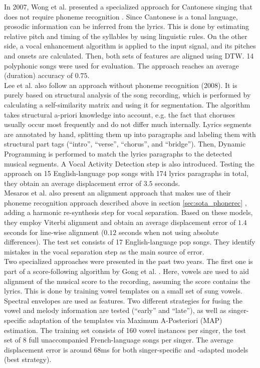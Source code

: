 In 2007, Wong et al. presented a specialized approach for Cantonese singing that does not require phoneme recognition \cite{WongSW07}. Since Cantonese is a tonal language, prosodic information can be inferred from the lyrics. This is done by estimating relative pitch and timing of the syllables by using linguistic rules. On the other side, a vocal enhancement algorithm is applied to the input signal, and its pitches and onsets are calculated. Then, both sets of features are aligned using DTW.
14 polyphonic songs were used for evaluation. The approach reaches an average (duration) accuracy of $0.75$.\\

Lee et al. also follow an approach without phoneme recognition \cite{LeeC08} (2008). It is purely based on structural analysis of the song recording, which is performed by calculating a self-similarity matrix and using it for segmentation. The algorithm takes structural a-priori knowledge into account, e.g. the fact that choruses usually occur most frequently and do not differ much internally. Lyrics segments are annotated by hand, splitting them up into paragraphs and labeling them with structural part tags (``intro'', ``verse'', ``chorus'', and ``bridge''). Then, Dynamic Programming is performed to match the lyrics paragraphs to the detected musical segments. A Vocal Activity Detection step is also introduced. Testing the approach on 15 English-language pop songs with 174 lyrics paragraphs in total, they obtain an average displacement error of $3.5$ seconds.\\ %

Mesaros et al. also present an alignment approach that makes use of their phoneme recognition approach described above in section \ref{sec:sota_phonerec} \cite{mesaros_alignment}, adding a harmonic re-synthesis step for vocal separation. Based on these models, they employ Viterbi alignment and obtain an average displacement error of $1.4$ seconds for line-wise alignment ($0.12$ seconds when not using absolute differences). The test set consists of 17 English-language pop songs. They identify mistakes in the vocal separation step as the main source of error.\\ %

Two specialized approaches were presented in the past two years. The first one is part of a score-following algorithm by Gong et al. \cite{gong_alignment}. Here, vowels are used to aid alignment of the musical score to the recording, assuming the score contains the lyrics. This is done by training vowel templates on a small set of sung vowels. Spectral envelopes are used as features. Two different strategies for fusing the vowel and melody information are tested (``early'' and ``late''), as well as singer-specific adaptation of the templates via Maximum A-Posteriori (MAP) estimation. The training set consists of 160 vowel instances per singer, the test set of 8 full unaccompanied French-language songs per singer.  The average displacement error is around 68ms for both singer-specific and -adapted models (best strategy).\\

